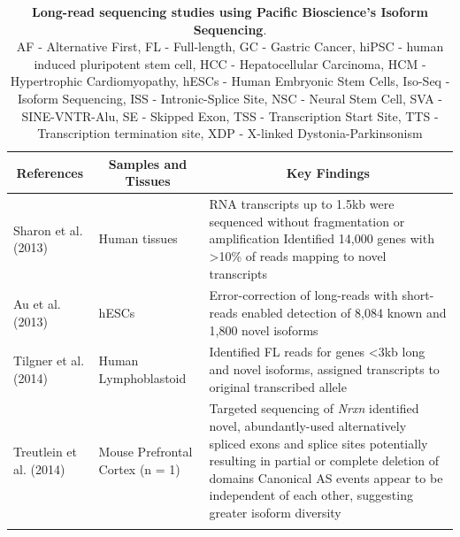 \begin{changemargin}{1.5cm}	
	\begin{landscape}
		\small %
		\setlength\tabcolsep{2pt} %
		\renewcommand{\arraystretch}{1}
		\begin{longtable}[c]{p{4cm}p{4cm}p{18cm}}
			\caption[Long-read sequencing studies using Pacific Bioscience's Isoform Sequencing]%
			{\textbf{Long-read sequencing studies using Pacific Bioscience's Isoform Sequencing}. \newline AF - Alternative First, FL - Full-length, GC - Gastric Cancer, hiPSC - human induced pluripotent stem cell, HCC - Hepatocellular Carcinoma, HCM - Hypertrophic Cardiomyopathy, hESCs - Human Embryonic Stem Cells, Iso-Seq - Isoform Sequencing, ISS - Intronic-Splice Site, NSC - Neural Stem Cell, SVA - SINE-VNTR-Alu, SE - Skipped Exon, TSS - Transcription Start Site, TTS - Transcription termination site, XDP - X-linked Dystonia-Parkinsonism}
			\label{tab: longread_isoseqstudies}\\
			
			\toprule
			\multicolumn{1}{c}{References} &
			\multicolumn{1}{c}{Samples and Tissues} &
			\multicolumn{1}{c}{Key Findings} \\* \midrule
			\endfirsthead
			\endhead
			\bottomrule
			\endfoot
			\endlastfoot
			\centering Sharon et al. (2013)\cite{Sharon2013} &
			\centering 20 Human tissues &
			\tabitem RNA transcripts up to 1.5kb were sequenced without fragmentation or amplification \newline
			\tabitem Identified 14,000 genes with >10\% of reads mapping to novel transcripts  \\
			\hdashline[0.5pt/5pt] 
			
			\centering Au et al. (2013)\cite{Au2013} &
			\centering hESCs &
			\tabitem Error-correction of long-reads with short-reads enabled detection of 8,084 known and 1,800 novel isoforms \\
			\hdashline[0.5pt/5pt]
			
			\centering Tilgner et al. (2014) \cite{Tilgner2014} &
			\centering Human Lymphoblastoid  &
			\tabitem Identified FL reads for genes <3kb long and novel isoforms, assigned transcripts to original transcribed allele \\
			\hdashline[0.5pt/5pt]
			
			\centering Treutlein et al. (2014)\cite{Treutlein2014} &
			\centering Mouse Prefrontal Cortex (n = 1) &
			\tabitem Targeted sequencing of \textit{Nrxn} identified novel, abundantly-used alternatively spliced exons and splice sites potentially resulting in partial or complete deletion of domains \newline
			\tabitem Canonical AS events appear to be independent of each other, suggesting greater isoform diversity  \\
			\hdashline[0.5pt/5pt]
			

\end{longtable}
\end{landscape}
\end{changemargin}
